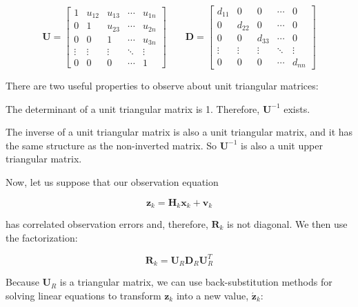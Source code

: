 \begin{equation*}
    \mathbf{U} =
    \begin{bmatrix}
        1 & u_{12} & u_{13} &\cdots & u_{1n} \\
        0 & 1 & u_{23} &\cdots & u_{2n} \\
        0 & 0 & 1 &\cdots & u_{3n} \\
        \vdots & \vdots & \vdots & \ddots & \vdots \\
        0 & 0 & 0 & \cdots & 1
    \end{bmatrix}
    \phantom{MM}
    \mathbf{D} =
    \begin{bmatrix}
        d_{11} & 0 & 0 &\cdots & 0 \\
        0 & d_{22} & 0 &\cdots & 0 \\
        0 & 0 & d_{33} &\cdots & 0 \\
        \vdots & \vdots & \vdots & \ddots & \vdots \\
        0 & 0 & 0 & \cdots & d_{nn}
    \end{bmatrix}
\end{equation*}

There are two useful properties to observe about unit triangular matrices:

\begin{myitemize}
    \item The determinant of a unit triangular matrix is 1. Therefore, $\mathbf{U}^{-1}$
    exists.
    \item The inverse of a unit triangular matrix is also a unit triangular matrix, and
    it has the same structure as the non-inverted matrix. So $\mathbf{U}^{-1}$ is also a
    unit upper triangular matrix.
\end{myitemize}

Now, let us suppose that our observation equation

\begin{equation*}
    \mathbf{z}_k = \mathbf{H}_k \mathbf{x}_k + \mathbf{v}_k
\end{equation*}

has correlated observation errors and, therefore, $\mathbf{R}_{k}$ is not diagonal. We
then use the factorization:

\begin{equation*}
    \mathbf{R}_k = \mathbf{U}_R \mathbf{D}_R \mathbf{U}_R^T
\end{equation*}

Because $\mathbf{U}_R$ is a triangular matrix, we can use back-substitution methods for
solving linear equations to transform $\mathbf{z}_k$ into a new value, $\mathbf{\acute{z}}_k$:

